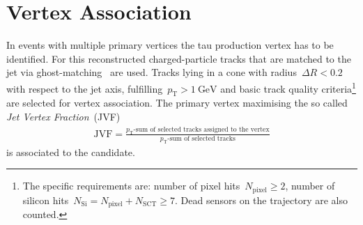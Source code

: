 \section{Vertex Association}
\label{sec:reco_vertex_assoc}
%
%
In events with multiple primary vertices the tau production vertex has to be
identified. For this reconstructed charged-particle tracks that are matched to
the jet via ghost-matching~\cite{ghost_matching} are used.
Tracks lying in a cone with radius~$\Delta R < 0.2$ with respect to the jet
axis, fulfilling~$p_\text{T} > \SI{1}{\GeV}$ and basic track quality
criteria\footnote{The specific requirements are: number of pixel
  hits~$N_\text{pixel} \geq 2$, number of silicon
  hits~$N_\text{Si} = N_\text{pixel} + N_\text{SCT} \geq 7$. Dead sensors on the
  trajectory are also counted.} are selected for vertex association.
The primary vertex maximising the so called \emph{Jet Vertex
  Fraction}~(JVF)
\begin{align*}
  \text{JVF} = \frac{p_\text{T}\text{-sum of selected tracks assigned to the vertex}}{p_\text{T}\text{-sum of selected tracks}}
\end{align*}
is associated to the \tauhadvis candidate.

